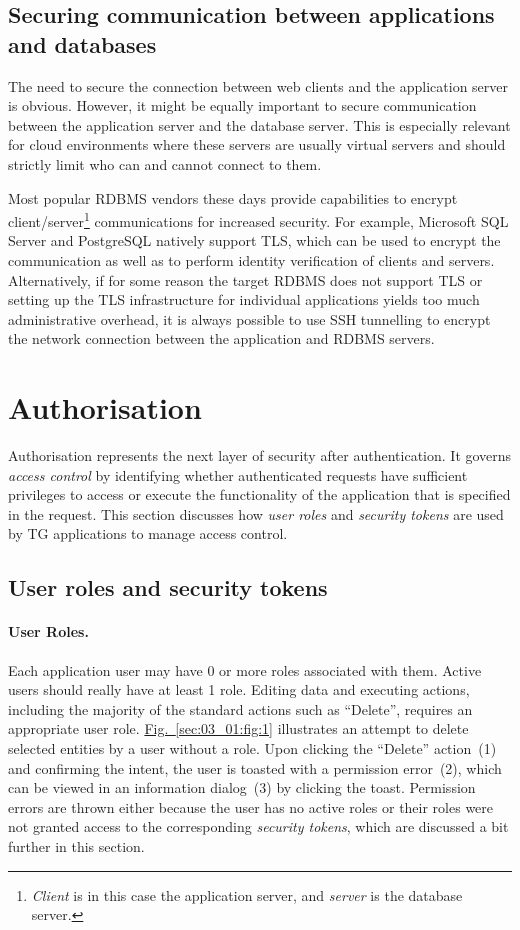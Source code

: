 \documentclass[a4paper,12pt,oneside,openright]{memoir}
\begin{document}
\subsection*{Securing communication between applications and databases}
	The need to secure the connection between web clients and the application server is obvious.
	However, it might be equally important to secure communication between the application server and the database server.
	This is especially relevant for cloud environments where these servers are usually virtual servers and should strictly limit who can and cannot connect to them.

	Most popular RDBMS vendors these days provide capabilities to encrypt client/server\footnote{\emph{Client} is in this case the application server, and \emph{server} is the database server.} communications for increased security.
	For example, Microsoft SQL Server and PostgreSQL natively support TLS, which can be used to encrypt the communication as well as to perform identity verification of clients and servers.
	Alternatively, if for some reason the target RDBMS does not support TLS or setting up the TLS infrastructure for individual applications yields too much administrative overhead, it is always possible to use SSH tunnelling to encrypt the network connection between the application and RDBMS servers.

\section*{Authorisation}\label{sec:03}

	Authorisation represents the next layer of security after authentication.
	It governs \emph{access control} by identifying whether authenticated requests have sufficient privileges to access or execute the functionality of the application that is specified in the request.
	This section discusses how \emph{user roles} and \emph{security tokens} are used by TG applications to manage access control.

\subsection*{User roles and security tokens}

	\paragraph{User Roles.}
	Each application user may have 0 or more roles associated with them.
	Active users should really have at least 1 role.
	Editing data and executing actions, including the majority of the standard actions such as ``Delete'', requires an appropriate user role.
	\hyperref[sec:03_01:fig:1]{Fig.~\ref*{sec:03_01:fig:1}} illustrates an attempt to delete selected entities by a user without a role.
	Upon clicking the ``Delete'' action~(1) and confirming the intent, the user is toasted with a permission error~(2), which can be viewed in an information dialog~(3) by clicking the toast.
	Permission errors are thrown either because the user has no active roles or their roles were not granted access to the corresponding \emph{security tokens}, which are discussed a bit further in this section.
\end{document}

